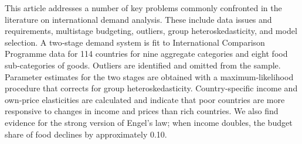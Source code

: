 This article addresses a number of key problems commonly confronted in the literature on international demand analysis. These include data issues and requirements, multistage budgeting, outliers, group heteroskedasticity, and model selection. A two‐stage demand system is fit to International Comparison Programme data for 114 countries for nine aggregate categories and eight food sub‐categories of goods. Outliers are identified and omitted from the sample. Parameter estimates for the two stages are obtained with a maximum‐likelihood procedure that corrects for group heteroskedasticity. Country‐specific income and own‐price elasticities are calculated and indicate that poor countries are more responsive to changes in income and prices than rich countries. We also find evidence for the strong version of Engel's law; when income doubles, the budget share of food declines by approximately 0.10.
